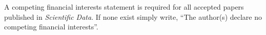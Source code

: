 \documentclass[english]{article}
\begin{document}
A competing financial interests statement is required for all accepted
papers published in \emph{Scientific Data}. If none exist simply write,
``The author(s) declare no competing financial interests''.







%



%







%
%




\end{document}
